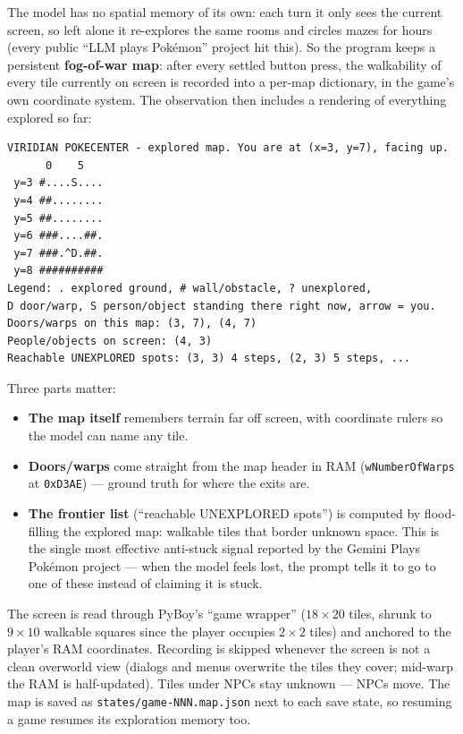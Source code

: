 \documentclass[11pt]{article}
\newcommand{\code}[1]{\texttt{#1}}
\begin{document}
The model has no spatial memory of its own: each turn it only sees the current screen, so left alone it re-explores the same rooms and circles mazes for hours (every public ``LLM plays Pokémon'' project hit this). So the program keeps a persistent \textbf{fog-of-war map}: after every settled button press, the walkability of every tile currently on screen is recorded into a per-map dictionary, in the game's own coordinate system. The observation then includes a rendering of everything explored so far:

\begin{verbatim}
VIRIDIAN POKECENTER - explored map. You are at (x=3, y=7), facing up.
      0    5
 y=3 #....S....
 y=4 ##........
 y=5 ##........
 y=6 ###....##.
 y=7 ###.^D.##.
 y=8 ##########
Legend: . explored ground, # wall/obstacle, ? unexplored,
D door/warp, S person/object standing there right now, arrow = you.
Doors/warps on this map: (3, 7), (4, 7)
People/objects on screen: (4, 3)
Reachable UNEXPLORED spots: (3, 3) 4 steps, (2, 3) 5 steps, ...
\end{verbatim}

Three parts matter:
\begin{itemize}[nosep]
  \item \textbf{The map itself} remembers terrain far off screen, with coordinate rulers so the model can name any tile.
  \item \textbf{Doors/warps} come straight from the map header in RAM (\code{wNumberOfWarps} at \code{0xD3AE}) --- ground truth for where the exits are.
  \item \textbf{The frontier list} (``reachable UNEXPLORED spots'') is computed by flood-filling the explored map: walkable tiles that border unknown space. This is the single most effective anti-stuck signal reported by the Gemini Plays Pokémon project --- when the model feels lost, the prompt tells it to go to one of these instead of claiming it is stuck.
\end{itemize}

The screen is read through PyBoy's ``game wrapper'' ($18\times20$ tiles, shrunk to $9\times10$ walkable squares since the player occupies $2\times2$ tiles) and anchored to the player's RAM coordinates. Recording is skipped whenever the screen is not a clean overworld view (dialogs and menus overwrite the tiles they cover; mid-warp the RAM is half-updated). Tiles under NPCs stay unknown --- NPCs move. The map is saved as \code{states/game-NNN.map.json} next to each save state, so resuming a game resumes its exploration memory too.
\end{document}
